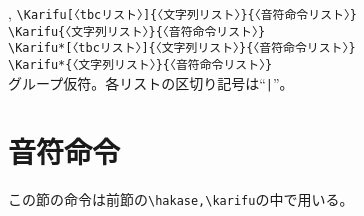 \documentclass[a4paper,luatex]{l3doc}
\begin{document}
\begin{function}{\Karifu,\Karifu*}
 \verb|\Karifu[〈tbcリスト〉]{〈文字列リスト〉}{〈音符命令リスト〉}|\\
 \verb|\Karifu{〈文字列リスト〉}{〈音符命令リスト〉}|\\
 \verb|\Karifu*[〈tbcリスト〉]{〈文字列リスト〉}{〈音符命令リスト〉}|\\
 \verb|\Karifu*{〈文字列リスト〉}{〈音符命令リスト〉}|\\
グループ仮符。各リストの区切り記号は“\verb+|+”。
\end{function}
\section{音符命令}
この節の命令は前節の\verb|\hakase,\karifu|の中で用いる。
\setlength{\columnseprule}{0.5pt}
\end{document}
